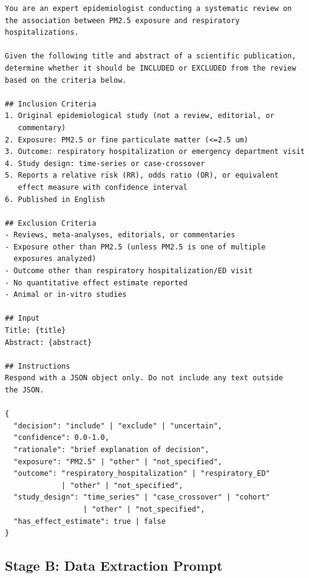 \documentclass[11pt]{article}
\begin{document}
\begin{lstlisting}[language={},caption={Screening prompt template (\texttt{configs/prompts/screening.txt})}]
You are an expert epidemiologist conducting a systematic review on
the association between PM2.5 exposure and respiratory
hospitalizations.

Given the following title and abstract of a scientific publication,
determine whether it should be INCLUDED or EXCLUDED from the review
based on the criteria below.

## Inclusion Criteria
1. Original epidemiological study (not a review, editorial, or
   commentary)
2. Exposure: PM2.5 or fine particulate matter (<=2.5 um)
3. Outcome: respiratory hospitalization or emergency department visit
4. Study design: time-series or case-crossover
5. Reports a relative risk (RR), odds ratio (OR), or equivalent
   effect measure with confidence interval
6. Published in English

## Exclusion Criteria
- Reviews, meta-analyses, editorials, or commentaries
- Exposure other than PM2.5 (unless PM2.5 is one of multiple
  exposures analyzed)
- Outcome other than respiratory hospitalization/ED visit
- No quantitative effect estimate reported
- Animal or in-vitro studies

## Input
Title: {title}
Abstract: {abstract}

## Instructions
Respond with a JSON object only. Do not include any text outside
the JSON.

{
  "decision": "include" | "exclude" | "uncertain",
  "confidence": 0.0-1.0,
  "rationale": "brief explanation of decision",
  "exposure": "PM2.5" | "other" | "not_specified",
  "outcome": "respiratory_hospitalization" | "respiratory_ED"
             | "other" | "not_specified",
  "study_design": "time_series" | "case_crossover" | "cohort"
                  | "other" | "not_specified",
  "has_effect_estimate": true | false
}
\end{lstlisting}

\subsection{Stage B: Data Extraction Prompt}
\end{document}
